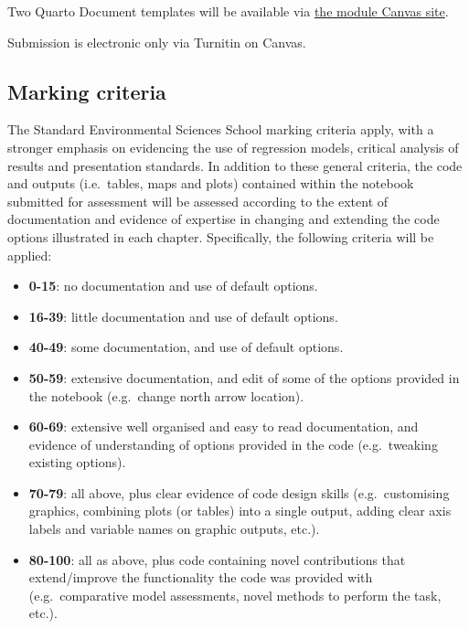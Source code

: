 \documentclass[
  letterpaper,
  DIV=11,
  numbers=noendperiod,
  oneside]{scrreprt}
\providecommand{\tightlist}{%
  \setlength{\itemsep}{0pt}\setlength{\parskip}{0pt}}\usepackage{longtable,booktabs,array}
\begin{document}
Two Quarto Document templates will be available via
\href{https://canvas.liverpool.ac.uk/courses/60454}{the module Canvas
site}.

Submission is electronic only via Turnitin on Canvas.

\subsection{Marking criteria}\label{marking-criteria}

The Standard Environmental Sciences School marking criteria apply, with
a stronger emphasis on evidencing the use of regression models, critical
analysis of results and presentation standards. In addition to these
general criteria, the code and outputs (i.e.~tables, maps and plots)
contained within the notebook submitted for assessment will be assessed
according to the extent of documentation and evidence of expertise in
changing and extending the code options illustrated in each chapter.
Specifically, the following criteria will be applied:

\begin{itemize}
\tightlist
\item
  \textbf{0-15}: no documentation and use of default options.
\item
  \textbf{16-39}: little documentation and use of default options.
\item
  \textbf{40-49}: some documentation, and use of default options.
\item
  \textbf{50-59}: extensive documentation, and edit of some of the
  options provided in the notebook (e.g.~change north arrow location).
\item
  \textbf{60-69}: extensive well organised and easy to read
  documentation, and evidence of understanding of options provided in
  the code (e.g.~tweaking existing options).
\item
  \textbf{70-79}: all above, plus clear evidence of code design skills
  (e.g.~customising graphics, combining plots (or tables) into a single
  output, adding clear axis labels and variable names on graphic
  outputs, etc.).
\item
  \textbf{80-100}: all as above, plus code containing novel
  contributions that extend/improve the functionality the code was
  provided with (e.g.~comparative model assessments, novel methods to
  perform the task, etc.).
\end{itemize}

\end{document}
